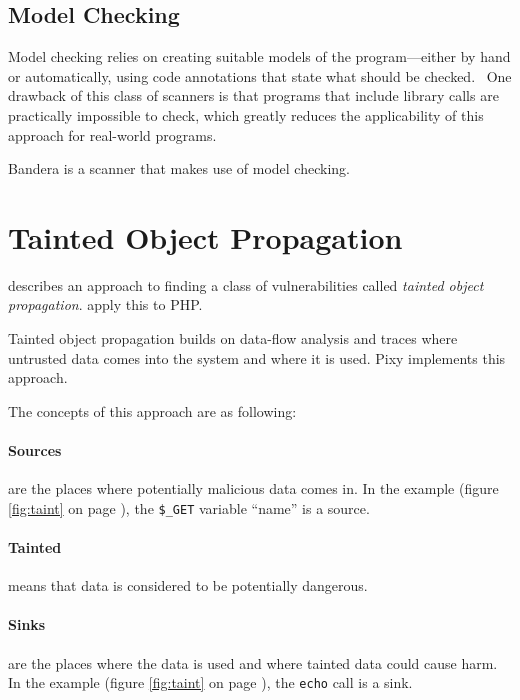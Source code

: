 \subsection{Model Checking}

Model checking relies on creating suitable models of the program---either by hand or automatically, using code annotations that state what should be checked.~\cite{data-flow-analysis} One drawback of this class of scanners is that programs that include library calls are practically impossible to check, which greatly reduces the applicability of this approach for real-world programs.~\cite{comparison-of-bug-finding-tools}

Bandera is a scanner that makes use of model checking.


\section{Tainted Object Propagation}
\label{tainting}
\cite{finding-security-vulnerabilities} describes an approach to finding a class of vulnerabilities called \emph{tainted object propagation}. \cite{pixy-short, pixy-long, pixy-dissertation} apply this to PHP.

Tainted object propagation builds on data-flow analysis and traces where untrusted data comes into the system and where it is used. Pixy implements this approach.

The concepts of this approach are as following:
\paragraph{Sources} are the places where potentially malicious data comes in. In the example (figure \ref{fig:taint} on page \pageref{fig:taint}), the \texttt{\$\_GET} variable ``name'' is a source.
\paragraph{Tainted} means that data is considered to be potentially dangerous.
\paragraph{Sinks} are the places where the data is used and where tainted data could cause harm. In the example (figure \ref{fig:taint} on page \pageref{fig:taint}), the \texttt{echo} call is a sink.

